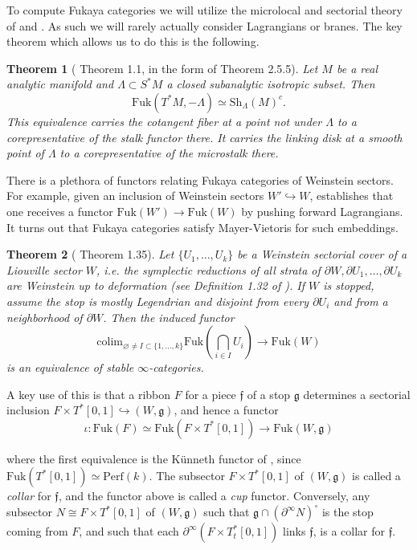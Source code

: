 \documentclass[11pt]{amsart}
\newtheorem{thm}{Theorem}[section]
\theoremstyle{definition}
\theoremstyle{remark}
\newcommand{\colim}{\mathrm{colim}}
\newcommand{\Fuk}{\mathrm{Fuk}}
\renewcommand{\emptyset}{\varnothing}
\numberwithin{equation}{section}
\begin{document}
To compute Fukaya categories we will utilize the microlocal and sectorial theory of \cite{GPSIII} and \cite{GPSI}. As such we will rarely actually consider Lagrangians or branes. The key theorem which allows us to do this is the following.

\begin{thm}[\cite{GPSIII} Theorem 1.1, in the form of \cite{gammage2022mirror} Theorem 2.5.5] Let $M$ be a real analytic manifold and $\Lambda\subset S^*M$ a closed subanalytic isotropic subset. Then $$\Fuk(T^*M,-\Lambda)\simeq\mathrm{Sh}_\Lambda(M)^c.$$ This equivalence carries the cotangent fiber at a point not under $\Lambda$ to a corepresentative of the stalk functor there. It carries the linking disk at a smooth point of $\Lambda$ to a corepresentative of the microstalk there. \end{thm}

There is a plethora of functors relating Fukaya categories of Weinstein sectors. For example, given an inclusion of Weinstein sectors $W' \hookrightarrow W$, \cite{GPSI} establishes that one receives a functor $\Fuk(W') \rightarrow \Fuk(W)$ by pushing forward Lagrangians. It turns out that Fukaya categories satisfy Mayer-Vietoris for such embeddings.

\begin{thm}[\cite{GPSI} Theorem 1.35]\label{sectorial}
   Let $\{U_1,\dots,U_k\}$ be a Weinstein sectorial cover of a Liouville sector $W$, i.e. the symplectic reductions of all strata of $\partial W,\partial U_1,\dots,\partial U_k$ are Weinstein up to deformation (see Definition 1.32 of \cite{GPSI}). If $W$ is stopped, assume the stop is mostly Legendrian and disjoint from every $\partial U_i$ and from a neighborhood of $\partial W$. Then the induced functor $$\colim_{\emptyset \neq I \subset \{1, ..., k\}} \Fuk(\bigcap_{i \in I} U_i) \rightarrow \Fuk(W)$$ \noindent is an equivalence of stable $\infty$-categories.
\end{thm}

A key use of this is that a ribbon $F$ for a piece $\mathfrak{f}$ of a stop $\mathfrak{g}$ determines a sectorial inclusion $F \times T^*[0,1]\hookrightarrow(W,\mathfrak g)$, and hence a functor $$\iota: \Fuk(F)\simeq \Fuk(F\times T^*[0,1])\rightarrow \Fuk(W, \mathfrak{g})$$

\noindent where the first equivalence is the K\"{u}nneth functor of \cite{GPSI}, since $\Fuk(T^*[0,1]) \simeq \mathrm{Perf}(k)$. The subsector $F \times T^*[0,1]$ of $(W, \mathfrak{g})$ is called a \textit{collar} for $\mathfrak{f}$, and the functor above is called a \textit{cup} functor. Conversely, any subsector $N\cong F\times T^*[0,1]$ of $(W,\mathfrak{g})$ such that $\mathfrak{g}\cap(\partial^\infty N)^\circ$ is the stop coming from $F$, and such that each $\partial^\infty(F\times T^*_t[0,1])$ links $\mathfrak{f}$, is a collar for $\mathfrak{f}$.\\
\end{document}
